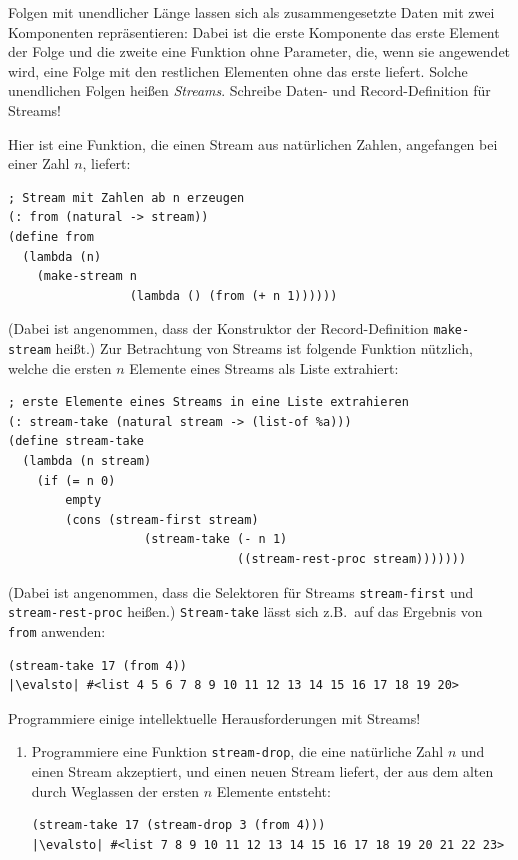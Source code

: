 \begin{aufgabe}
  Folgen mit unendlicher Länge lassen sich als
  zusammengesetzte Daten mit zwei Komponenten repräsentieren: Dabei
  ist die erste Komponente das erste Element der Folge und die zweite
  eine Funktion ohne Parameter, die, wenn sie angewendet wird, eine Folge mit
  den restlichen Elementen ohne das erste liefert.
  Solche unendlichen Folgen heißen \textit{Streams}.
  Schreibe Daten- und Record-Definition für Streams!

  Hier ist eine Funktion, die einen Stream aus natürlichen Zahlen,
  angefangen bei einer Zahl $n$, liefert:
  \begin{lstlisting}
; Stream mit Zahlen ab n erzeugen
(: from (natural -> stream))
(define from
  (lambda (n)
    (make-stream n
                 (lambda () (from (+ n 1))))))
  \end{lstlisting}
  (Dabei ist angenommen, dass der Konstruktor der Record-Definition
  \lstinline{make-stream} heißt.)
  Zur Betrachtung von Streams ist folgende Funktion nützlich, welche
  die ersten $n$ Elemente eines Streams als Liste extrahiert:
  \begin{lstlisting}
; erste Elemente eines Streams in eine Liste extrahieren
(: stream-take (natural stream -> (list-of %a)))
(define stream-take
  (lambda (n stream)
    (if (= n 0)
        empty
        (cons (stream-first stream)
                   (stream-take (- n 1)
                                ((stream-rest-proc stream)))))))
   \end{lstlisting}
   (Dabei ist angenommen, dass die Selektoren für Streams
   \lstinline{stream-first} und \lstinline{stream-rest-proc} heißen.)
   \lstinline{Stream-take} lässt sich z.B.\ auf das Ergebnis von
   \lstinline{from} anwenden:
   \begin{lstlisting}
(stream-take 17 (from 4))
|\evalsto| #<list 4 5 6 7 8 9 10 11 12 13 14 15 16 17 18 19 20>
   \end{lstlisting}
   Programmiere einige intellektuelle Herausforderungen mit Streams!
   \begin{enumerate}
   \item Programmiere eine Funktion \lstinline{stream-drop}, die eine
     natürliche Zahl $n$ und einen Stream akzeptiert, und einen neuen
     Stream liefert, der aus dem alten durch Weglassen der ersten $n$
     Elemente entsteht:
     \begin{lstlisting}
(stream-take 17 (stream-drop 3 (from 4)))
|\evalsto| #<list 7 8 9 10 11 12 13 14 15 16 17 18 19 20 21 22 23>

\end{lstlisting}
\end{enumerate}
\end{aufgabe}

